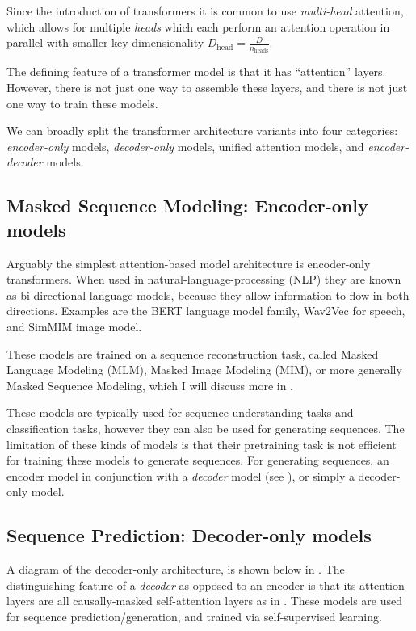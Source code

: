 Since the introduction of transformers it is common to use \textit{multi-head} attention, which allows for multiple \textit{heads} which each perform an attention operation in parallel with smaller key dimensionality $D_{\text{head}} = \frac{D}{ n_{\text{heads}}}$.

The defining feature of a transformer model is that it has ``attention'' layers. However, there is not just one way to assemble these layers, and there is not just one way to train these models.

We can broadly split the transformer architecture variants into four categories: \textit{encoder-only} models, \textit{decoder-only} models, unified attention models, and \textit{encoder-decoder} models.

\subsection{Masked Sequence Modeling: Encoder-only models}
\label{ss:msm}

Arguably the simplest attention-based model architecture is encoder-only transformers. When used in natural-language-processing (NLP) they are known as bi-directional language models, because they allow information to flow in both directions. Examples are the BERT \cite{bert} language model family, Wav2Vec \cite{wav2vec} for speech, and SimMIM \cite{sim-mim} image model.

These models are trained on a sequence reconstruction task, called Masked Language Modeling (MLM), Masked Image Modeling (MIM), or more generally Masked Sequence Modeling, which I will discuss more in .

These models are typically used for sequence understanding tasks and classification tasks, however they can also be used for generating sequences. The limitation of these kinds of models is that their pretraining task is not efficient for training these models to generate sequences. For generating sequences, an encoder model in conjunction with a \textit{decoder} model (see ), or simply a decoder-only model.

\subsection{Sequence Prediction: Decoder-only models}
\label{ss:decoder-only}

A diagram of the decoder-only architecture, is shown below in . The distinguishing feature of a \textit{decoder} as opposed to an encoder is that its attention layers are all causally-masked self-attention layers as in . These models are used for sequence prediction/generation, and trained via self-supervised learning.

